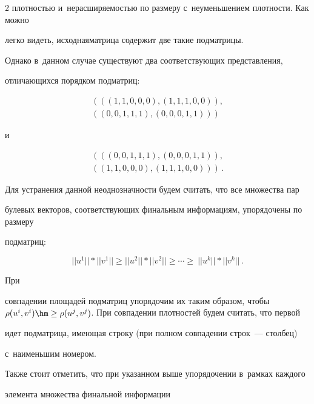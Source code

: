 \begin{multicols}{2}
плотностью и~нерасширяемостью по размеру с~неуменьшением плот\-ности. Как можно 


легко видеть, исходная\linebreak матрица содержит две такие подматрицы.


Однако в~данном случае существуют два со\-от\-вет\-ст\-ву\-ющих представления, 


отличающихся порядком подматриц: 


\begin{multline*}


\left(\left( (1,1,0,0,0),(1,1,1,0,0)\right),\right.\\


\left.\left((0,0,1,1,1), (0,0,0,1,1)\right)\right)


\end{multline*}


 и


 \begin{multline*}


\left(\left((0,0,1,1,1),  (0,0,0,1,1)\right),\right.\\ 


\left.\left((1,1,0,0,0),(1,1,1,0,0)\right)\right)\,.


\end{multline*}


Для устранения данной неоднозначности будем считать, что все множества пар 


булевых векторов, соответствующих финальным информациям, упорядочены по размеру 


подматриц:


$$


||u^1||*||v^1|| \geq ||u^2||*||v^2|| \geq \cdots \geq~||u^k||*||v^k||\,.


$$


 При 


совпадении площадей подматриц упорядочим их таким образом, чтобы $\rho(u^i, 


v^i)\hm \geq \rho(u^j,v^j)$. При совпадении плотностей будем считать, что первой 


идет подматрица, имеющая строку (при полном совпадении строк~--- столбец) 


с~наименьшим номером.





Также стоит отметить, что при указанном выше упорядочении в~рамках каждого 


элемента множества финальной информации 



\end{multicols}
